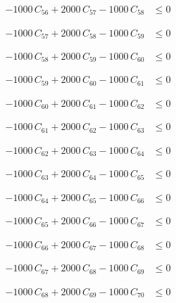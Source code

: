 \documentclass[a4paper,11pt]{article}
\begin{document}
\begin{align}
-1000\,C_{56} + 2000\,C_{57} - 1000\,C_{58} &\leq 0 \nonumber
\end{align}

\begin{align}
-1000\,C_{57} + 2000\,C_{58} - 1000\,C_{59} &\leq 0 \nonumber
\end{align}

\begin{align}
-1000\,C_{58} + 2000\,C_{59} - 1000\,C_{60} &\leq 0 \nonumber
\end{align}

\begin{align}
-1000\,C_{59} + 2000\,C_{60} - 1000\,C_{61} &\leq 0 \nonumber
\end{align}

\begin{align}
-1000\,C_{60} + 2000\,C_{61} - 1000\,C_{62} &\leq 0 \nonumber
\end{align}

\begin{align}
-1000\,C_{61} + 2000\,C_{62} - 1000\,C_{63} &\leq 0 \nonumber
\end{align}

\begin{align}
-1000\,C_{62} + 2000\,C_{63} - 1000\,C_{64} &\leq 0 \nonumber
\end{align}

\begin{align}
-1000\,C_{63} + 2000\,C_{64} - 1000\,C_{65} &\leq 0 \nonumber
\end{align}

\begin{align}
-1000\,C_{64} + 2000\,C_{65} - 1000\,C_{66} &\leq 0 \nonumber
\end{align}

\begin{align}
-1000\,C_{65} + 2000\,C_{66} - 1000\,C_{67} &\leq 0 \nonumber
\end{align}

\begin{align}
-1000\,C_{66} + 2000\,C_{67} - 1000\,C_{68} &\leq 0 \nonumber
\end{align}

\begin{align}
-1000\,C_{67} + 2000\,C_{68} - 1000\,C_{69} &\leq 0 \nonumber
\end{align}

\begin{align}
-1000\,C_{68} + 2000\,C_{69} - 1000\,C_{70} &\leq 0 \nonumber
\end{align}
\end{document}
